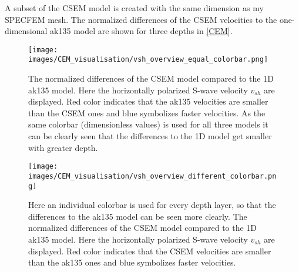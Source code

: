 A subset of the CSEM model is created with the same dimension as my SPECFEM mesh. 
The normalized differences of the CSEM velocities to the one-dimensional ak135 model \citep{Kennett1995} are shown for three
depths in \autoref{CEM}.

\begin{figure}[h]
\begin{center}
\texttt{[image: images/CEM\_visualisation/vsh\_overview\_equal\_colorbar.png]}
\caption[Differences of CSEM to ak135 (same colorbar).]{The normalized differences of the CSEM model 
\citep{Afanasiev2014} compared to the 1D ak135 model. 
Here the horizontally polarized S-wave velocity $v_{sh}$ are displayed. Red color indicates that the ak135
velocities are smaller than the CSEM ones and blue symbolizes faster velocities.
As the same colorbar (dimensionless values) is used for all three models it can be clearly seen that the differences
to the 1D model get smaller with greater depth. }  
\label{CEM}
\end{center}
\end{figure}

\begin{figure}[h]
\begin{center}
\texttt{[image: images/CEM\_visualisation/vsh\_overview\_different\_colorbar.png]}
\caption[Differences of CSEM to ak135 (individual colorbar).]{Here an individual colorbar is used for 
every depth layer, so that the differences to the 
ak135 model can be seen more clearly. 
The normalized differences of the CSEM model \citep{Afanasiev2014} compared to the 1D ak135 model. 
Here the horizontally polarized S-wave velocity $v_{sh}$ are displayed. Red color indicates that the CSEM
velocities are smaller than the ak135 ones and blue symbolizes faster velocities.}  
\label{CEM}
\end{center}
\end{figure}


